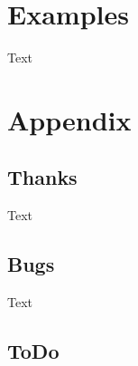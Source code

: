 \documentclass[openany,12pt,tocdepth=3]{ltx-md}
\begin{document}
\chapter{Examples}\label{chap:examples}
Text 

\appendix
\chapter{Appendix}\label{chap:appendix}
\section{Thanks}
Text 
\section{Bugs}
Text 

\section{ToDo}
\end{document}
